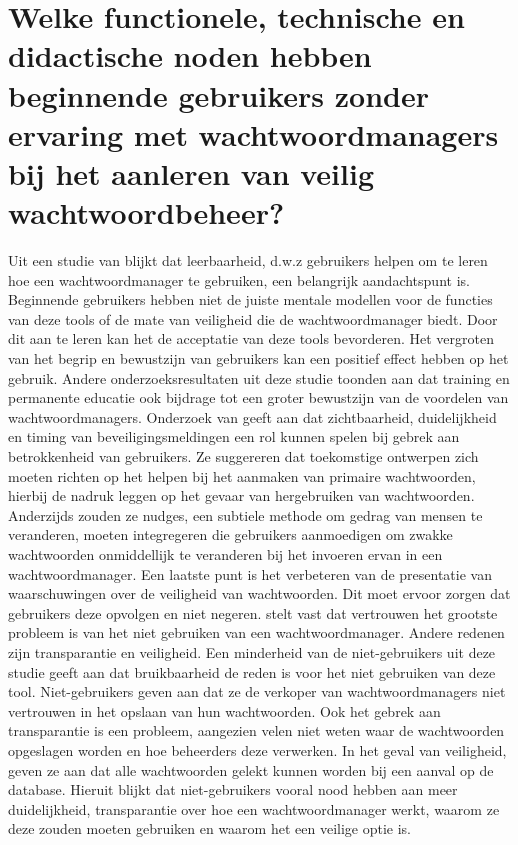 \section{Welke functionele, technische en didactische noden hebben beginnende gebruikers zonder ervaring met wachtwoordmanagers bij het aanleren van veilig wachtwoordbeheer?}

Uit een studie van \textcite{Chaudhary2019} blijkt dat leerbaarheid, d.w.z gebruikers helpen om te leren hoe een wachtwoordmanager te gebruiken, een belangrijk aandachtspunt is. Beginnende gebruikers hebben niet de juiste mentale modellen voor de functies van deze tools of de mate van veiligheid die de wachtwoordmanager biedt. Door dit aan te leren kan het de acceptatie van deze tools bevorderen. Het vergroten van het begrip en bewustzijn van gebruikers kan een positief effect hebben op het gebruik. Andere onderzoeksresultaten uit deze studie toonden aan dat training en permanente educatie ook bijdrage tot een groter bewustzijn van de voordelen van wachtwoordmanagers.
Onderzoek van \textcite{Cabarcos2025} geeft aan dat zichtbaarheid, duidelijkheid en timing van beveiligingsmeldingen een rol kunnen spelen bij gebrek aan betrokkenheid van gebruikers. Ze suggereren dat toekomstige ontwerpen zich moeten richten op het helpen bij het aanmaken van primaire wachtwoorden, hierbij de nadruk leggen op het gevaar van hergebruiken van wachtwoorden. Anderzijds zouden ze nudges, een subtiele methode om gedrag van mensen te veranderen, moeten integregeren die gebruikers aanmoedigen om zwakke wachtwoorden onmiddellijk te veranderen bij het invoeren ervan in een wachtwoordmanager. Een laatste punt is het verbeteren van de presentatie van waarschuwingen over de veiligheid van wachtwoorden. Dit moet ervoor zorgen dat gebruikers deze opvolgen en niet negeren.
\textcite{Alodhyani2020} stelt vast dat vertrouwen het grootste probleem is van het niet gebruiken van een wachtwoordmanager. Andere redenen zijn transparantie en veiligheid. Een minderheid van de niet-gebruikers uit deze studie geeft aan dat bruikbaarheid de reden is voor het niet gebruiken van deze tool. Niet-gebruikers geven aan dat ze de verkoper van wachtwoordmanagers niet vertrouwen in het opslaan van hun wachtwoorden. Ook het gebrek aan transparantie is een probleem, aangezien velen niet weten waar de wachtwoorden opgeslagen worden en hoe beheerders deze verwerken. In het geval van veiligheid, geven ze aan dat alle wachtwoorden gelekt kunnen worden bij een aanval op de database. 
Hieruit blijkt dat niet-gebruikers vooral nood hebben aan meer duidelijkheid, transparantie over hoe een wachtwoordmanager werkt, waarom ze deze zouden moeten gebruiken en waarom het een veilige optie is. 


